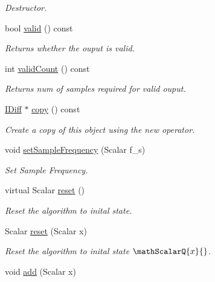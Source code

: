 \begin{DoxyCompactItemize}
\begin{DoxyCompactList}\small\item\em Destructor. \end{DoxyCompactList}\item 
bool \hyperlink{classow__core_1_1ScalarFiniteDifference_a8642819335cad635881477a0e855502e}{valid} () const 
\begin{DoxyCompactList}\small\item\em Returns whether the ouput is valid. \end{DoxyCompactList}\item 
int \hyperlink{classow__core_1_1ScalarFiniteDifference_ab0bb516e3fb0516e3dc3215d07726f22}{valid\+Count} () const 
\begin{DoxyCompactList}\small\item\em Returns num of samples required for valid ouput. \end{DoxyCompactList}\item 
\hyperlink{classow__core_1_1IScalarDifferentiation}{I\+Diff} $\ast$ \hyperlink{classow__core_1_1ScalarFiniteDifference_ab4d318553c2a4c10e54a887e3a0d2f8a}{copy} () const 
\begin{DoxyCompactList}\small\item\em Create a copy of this object using the new operator. \end{DoxyCompactList}\item 
void \hyperlink{classow__core_1_1ScalarFiniteDifference_a9705eb934214b48188afa6aed009dcce}{set\+Sample\+Frequency} (Scalar f\+\_\+s)
\begin{DoxyCompactList}\small\item\em Set Sample Frequency. \end{DoxyCompactList}\item 
virtual Scalar \hyperlink{classow__core_1_1ScalarFiniteDifference_a75258340d011a80c7ef46dfefed5fc2a}{reset} ()
\begin{DoxyCompactList}\small\item\em Reset the algorithm to inital state. \end{DoxyCompactList}\item 
Scalar \hyperlink{classow__core_1_1ScalarFiniteDifference_a3c1e94b61e9ca3d267fd7b61f35c1acd}{reset} (Scalar x)
\begin{DoxyCompactList}\small\item\em Reset the algorithm to inital state $\mathScalarQ{x}{}$. \end{DoxyCompactList}\item 
void \hyperlink{classow__core_1_1ScalarFiniteDifference_a541c94f74c0bc75f309d725b60c1aba3}{add} (Scalar x)

\end{DoxyCompactItemize}
